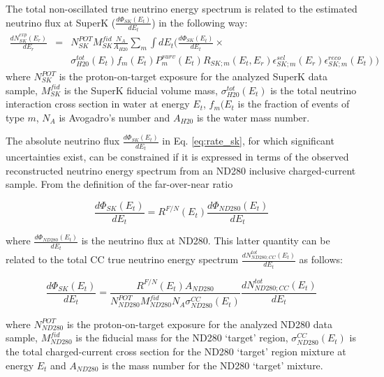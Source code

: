 The total non-oscillated true neutrino energy spectrum is related to
the estimated neutrino flux at SuperK
($\frac{d\Phi_{SK}(E_{t})}{dE_{t}}$) in the following way:
{
\arraycolsep=2pt
\begin{equation}
\displaystyle
\begin{array}{lcl}
  \frac{dN_{SK}^{exp}(E_{r})}{dE_{r}}  & = & 
    N_{SK}^{POT} M_{SK}^{fid} \frac{N_{A}}{A_{H20}}
    {\displaystyle \sum_{m} \int dE_{t}} \Bigg( 
    \frac{d\Phi_{SK}(E_{t})}{dE_{t}} \times \\ & &
    \sigma_{H20}^{tot}(E_{t}) 
    f_{m}(E_{t}) 
    P_{m}^{surv}(E_{t}) 
    R_{SK;m}(E_{t},E_{r}) 
    \epsilon^{sel}_{SK;m}(E_{r}) 
    \epsilon^{reco}_{SK;m}(E_{t}) \Bigg)
\end{array}
\label{eq:rate_sk}
\end{equation}
}
where 
$N_{SK}^{POT}$ is the proton-on-target exposure for the analyzed
SuperK data sample,
$M_{SK}^{fid}$ is the SuperK fiducial volume mass,
$\sigma_{H20}^{tot}(E_{t})$ is the total neutrino interaction cross section in water at energy $E_{t}$, 
$f_{m}(E_{t}$ is the fraction of events of type $m$,
$N_{A}$ is Avogadro's number and $A_{H20}$ is the water mass number.

The absolute neutrino flux $\frac{d\Phi_{SK}(E_{t})}{dE_{t}}$
in Eq. \ref{eq:rate_sk}, for which significant uncertainties exist,
can be constrained if it is expressed in terms of 
the observed reconstructed neutrino energy spectrum from an ND280 
inclusive charged-current sample.
From the definition of the far-over-near ratio

\begin{equation}
\displaystyle
  \frac{d\Phi_{SK}(E_{t})}{dE_{t}} = 
    R^{F/N}(E_{t}) \frac{d\Phi_{ND280}(E_{t})}{dE_{t}}
\end{equation}

where $\frac{d\Phi_{ND280}(E_{t})}{dE_{t}}$ is the neutrino flux at ND280.
This latter quantity can be related to the total CC true neutrino energy spectrum
$\frac{dN_{ND280;CC}^{tot}(E_{t})}{dE_{t}}$ as follows:

\begin{equation}
\displaystyle
  \frac{d\Phi_{SK}(E_{t})}{dE_{t}} = 
  \frac{R^{F/N}(E_{t}) A_{ND280}}{N_{ND280}^{POT} M_{ND280}^{fid} N_{A} \sigma^{CC}_{ND280}(E_{t})} 
  \frac{dN_{ND280;CC}^{tot}(E_{t})}{dE_{t}}
\end{equation}

where 
$N_{ND280}^{POT}$ is the proton-on-target exposure for the analyzed
ND280 data sample,
$M_{ND280}^{fid}$ is the fiducial mass for the ND280 `target' region, $\sigma^{CC}_{ND280}(E_{t})$ is the total 
charged-current cross section for the ND280 `target' region mixture at energy $E_{t}$
and $A_{ND280}$ is the mass number for the ND280 `target' mixture.

